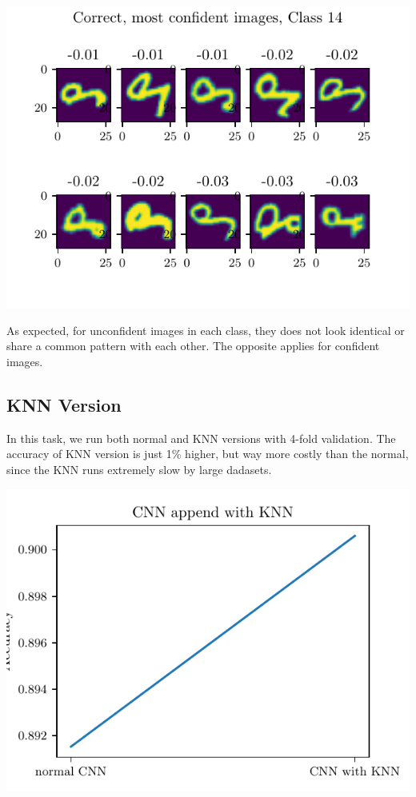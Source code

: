 \documentclass[11pt]{article}
\begin{document}
\includegraphics{figures/2d_confident_imgs_class_14.pdf}

As expected, for unconfident images in each class, they does not look identical or share a common pattern with each other. The opposite applies for confident images.

\subsection{KNN Version}

In this task, we run both normal and KNN versions with 4-fold validation. The accuracy of KNN version is just 1\% higher, but way more costly than the normal, since the KNN runs extremely slow by large dadasets. 

\includegraphics{figures/2e_dnn.pdf}
\end{document}
